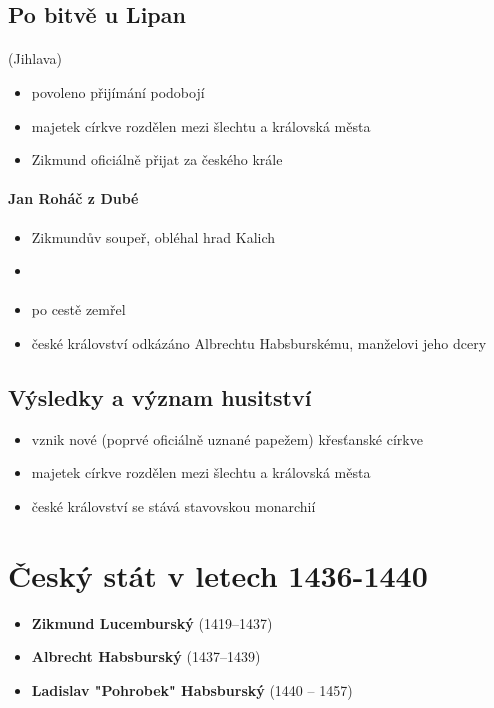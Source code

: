 \subsection{Po bitvě u Lipan}
\paragraph{} (Jihlava)
\begin{itemize}
\item povoleno přijímání podobojí
\item majetek církve rozdělen mezi šlechtu a královská města
\item Zikmund oficiálně přijat za českého krále
\end{itemize}

\paragraph{Jan Roháč z Dubé}
\begin{itemize}
\item Zikmundův soupeř, obléhal hrad Kalich
\item {}
\end{itemize}

\paragraph{}
\begin{itemize}
\item po cestě zemřel
\item české království odkázáno Albrechtu Habsburskému, manželovi jeho dcery
\end{itemize}

\subsection{Výsledky a význam husitství}
\begin{itemize}
\item vznik nové (poprvé oficiálně uznané papežem) křesťanské církve
\item majetek církve rozdělen mezi šlechtu a královská města
\item české království se stává stavovskou monarchií
\end{itemize}



\section{Český stát v letech 1436-1440}
\begin{itemize}
\item \textbf{Zikmund Lucemburský} (1419--1437)
\item \textbf{Albrecht Habsburský} (1437--1439)
\item \textbf{Ladislav "Pohrobek" Habsburský} (1440 -- 1457)
\end{itemize}

